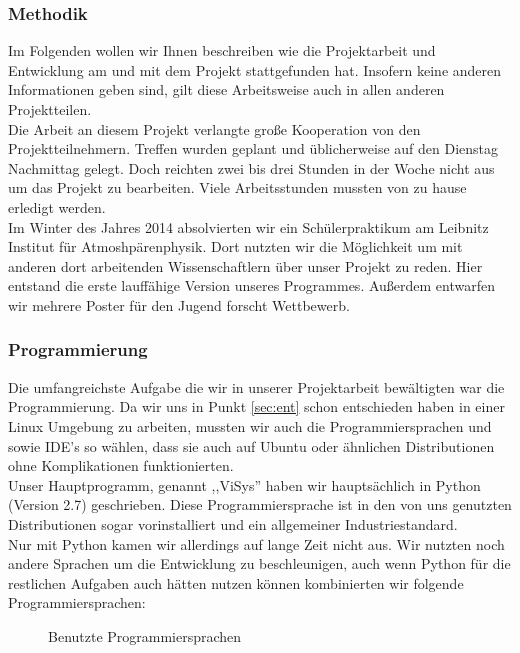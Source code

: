 \documentclass[a4paper,oneside,12pt,titlepage]{article}
\newcommand{\jf}{Jugend forscht }
\newcommand{\vs}{ViSys}
\begin{document}
\subsubsection{Methodik} %
Im Folgenden wollen wir Ihnen beschreiben wie die Projektarbeit und Entwicklung am  und mit dem Projekt stattgefunden hat.
Insofern keine anderen Informationen geben sind, gilt diese Arbeitsweise auch in allen anderen Projektteilen. \\
Die Arbeit an diesem Projekt verlangte große Kooperation von den Projektteilnehmern. Treffen wurden geplant und üblicherweise auf den Dienstag Nachmittag gelegt. Doch reichten zwei bis drei Stunden in der Woche nicht aus um das Projekt zu bearbeiten. Viele Arbeitsstunden mussten von zu hause erledigt werden.\\
Im Winter des Jahres 2014 absolvierten wir ein Schülerpraktikum am Leibnitz Institut für Atmoshpärenphysik. %
Dort nutzten wir die Möglichkeit um mit anderen dort arbeitenden Wissenschaftlern über unser Projekt zu reden. Hier entstand die erste lauffähige Version unseres Programmes. Außerdem entwarfen wir mehrere Poster für den \jf Wettbewerb.

\subsubsection{Programmierung}
Die umfangreichste Aufgabe die wir in unserer Projektarbeit bewältigten war die Programmierung. Da wir uns in Punkt \ref{sec:ent}  schon entschieden haben in einer Linux Umgebung zu arbeiten, mussten wir auch die Programmiersprachen und sowie IDE's so wählen, dass sie auch auf Ubuntu oder ähnlichen Distributionen ohne Komplikationen funktionierten.\\
Unser Hauptprogramm, genannt ,,\vs '' haben wir hauptsächlich in Python (Version 2.7) \cite{python27} geschrieben. Diese Programmiersprache ist in den von uns genutzten Distributionen sogar vorinstalliert und ein allgemeiner Industriestandard.\\
Nur mit Python kamen wir allerdings auf lange Zeit nicht aus. Wir nutzten noch andere Sprachen um die Entwicklung zu beschleunigen, auch wenn Python für die restlichen Aufgaben auch hätten nutzen können kombinierten wir folgende Programmiersprachen:
\begin{figure}[H]

\label{fig:pyvi}
\caption{Benutzte Programmiersprachen}
\end{figure}
\end{document}
